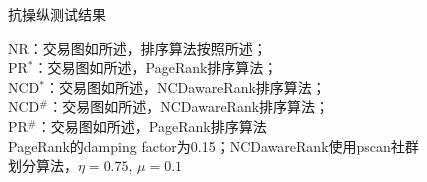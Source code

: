 \begin{figure}[h]
	\centering
	\caption{抗操纵测试结果}\label{fig:antiManipulation}
	\caption*{\footnotesize{NR：交易图如所述，排序算法按照所述；\\PR$^*$：交易图如所述，PageRank排序算法；\\ NCD$^*$：交易图如所述，NCDawareRank排序算法；\\ NCD$^{\#}$：交易图如\cite{nem}所述，NCDawareRank排序算法；\\ PR$^{\#}$：交易图如\cite{nem}所述，PageRank排序算法 \\ PageRank的damping factor为0.15；NCDawareRank使用pscan\cite{chang2017mathsf}社群划分算法，$\eta=0.75$, $\mu=0.1$}}
\end{figure}

